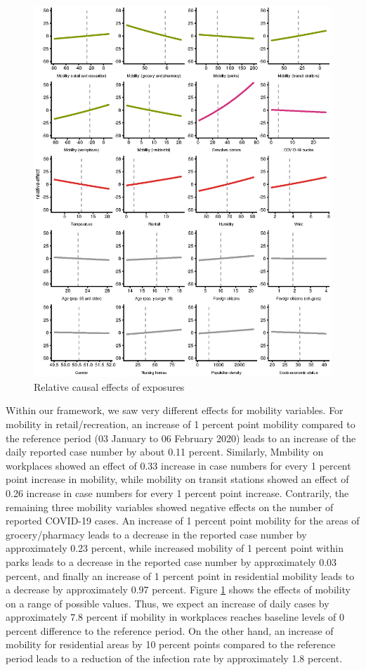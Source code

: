 \documentclass[]{elsarticle} %
\begin{document}
\begin{figure}
\centering
\includegraphics{figures/f_exposure_vs_effect.eps}
\caption{\label{fig:effectsrange}Relative causal effects of exposures}
\end{figure}

Within our framework, we saw very different effects for mobility variables. For mobility in retail/recreation, an increase of 1 percent point mobility compared to the reference period (03 January to 06 February 2020) leads to an increase of the daily reported case number by about 0.11 percent. Similarly, Mmbility on workplaces showed an effect of 0.33 increase in case numbers for every 1 percent point increase in mobility, while mobility on transit stations showed an effect of 0.26 increase in case numbers for every 1 percent point increase. Contrarily, the remaining three mobility variables showed negative effects on the number of reported COVID-19 cases. An increase of 1 percent point mobility for the areas of grocery/pharmacy leads to a decrease in the reported case number by approximately 0.23 percent, while increased mobility of 1 percent point within parks leads to a decrease in the reported case number by approximately 0.03 percent, and finally an increase of 1 percent point in residential mobility leads to a decrease by approximately 0.97 percent. Figure \ref{fig:effectsrange} shows the effects of mobility on a range of possible values. Thus, we expect an increase of daily cases by approximately 7.8 percent if mobility in workplaces reaches baseline levels of 0 percent difference to the reference period. On the other hand, an increase of mobility for residential areas by 10 percent points compared to the reference period leads to a reduction of the infection rate by approximately 1.8 percent.
\end{document}
